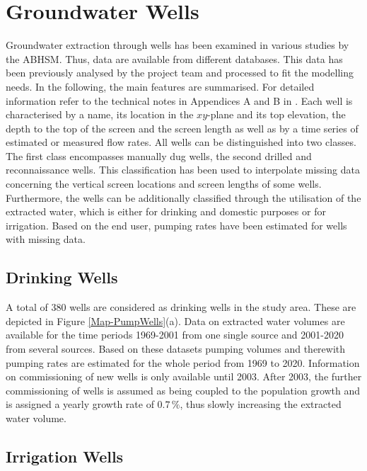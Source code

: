
\section{Groundwater Wells}
\label{Sec-GWWells}

Groundwater extraction through wells has been examined in various studies by the ABHSM. 
Thus, data are available from different databases. 
This data has been previously analysed by the project team and processed to fit the modelling needs. 
In the following, the main features are summarised. 
For detailed information refer to the technical notes in Appendices A and B in \textcite{Horn.2021}. 
Each well is characterised by a name, its location in the $xy$-plane and its top elevation, the depth to the top of the screen and the screen length as well as by a time series of estimated or measured flow rates. 
All wells can be distinguished into two classes. 
The first class encompasses manually dug wells, the second drilled and reconnaissance wells. 
This classification has been used to interpolate missing data concerning the vertical screen locations and screen lengths of some wells. 
Furthermore, the wells can be additionally classified through the utilisation of the extracted water, which is either for drinking and domestic purposes or for irrigation. 
Based on the end user, pumping rates have been estimated for wells with missing data.

\subsection{Drinking Wells}

A total of 380 wells are considered as drinking wells in the study area. 
These are depicted in Figure \ref{Map-PumpWells}(a). 
Data on extracted water volumes are available for the time periods 1969-2001 from one single source and 2001-2020 from several sources. 
Based on these datasets pumping volumes and therewith pumping rates are estimated for the whole period from 1969 to 2020. 
Information on commissioning of new wells is only available until 2003. 
After 2003, the further commissioning of wells is assumed as being coupled to the population growth and is assigned a yearly growth rate of $0.7 \, \%$, thus slowly increasing the extracted water volume.

\subsection{Irrigation Wells}

